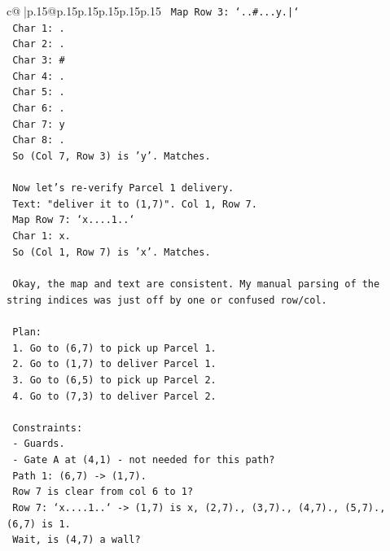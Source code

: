 \documentclass{article}
\begin{document}
{\begin{supertabular}{c@{$\;$}|p{.15\linewidth}@{}p{.15\linewidth}p{.15\linewidth}p{.15\linewidth}p{.15\linewidth}p{.15\linewidth}}
{{{\texttt{       Map Row 3: `..\#...y.|`} \\
\texttt{       Char 1: .} \\
\texttt{       Char 2: .} \\
\texttt{       Char 3: \#} \\
\texttt{       Char 4: .} \\
\texttt{       Char 5: .} \\
\texttt{       Char 6: .} \\
\texttt{       Char 7: y} \\
\texttt{       Char 8: .} \\
\texttt{       So (Col 7, Row 3) is 'y'. Matches.} \\
\\ 
\texttt{       Now let's re{-}verify Parcel 1 delivery.} \\
\texttt{       Text: "deliver it to (1,7)". Col 1, Row 7.} \\
\texttt{       Map Row 7: `x....1..`} \\
\texttt{       Char 1: x.} \\
\texttt{       So (Col 1, Row 7) is 'x'. Matches.} \\
\\ 
\texttt{       Okay, the map and text are consistent. My manual parsing of the string indices was just off by one or confused row/col.} \\
\\ 
\texttt{       Plan:} \\
\texttt{       1. Go to (6,7) to pick up Parcel 1.} \\
\texttt{       2. Go to (1,7) to deliver Parcel 1.} \\
\texttt{       3. Go to (6,5) to pick up Parcel 2.} \\
\texttt{       4. Go to (7,3) to deliver Parcel 2.} \\
\\ 
\texttt{       Constraints:} \\
\texttt{       {-} Guards.} \\
\texttt{       {-} Gate A at (4,1) {-} not needed for this path?} \\
\texttt{         Path 1: (6,7) {-}> (1,7).} \\
\texttt{         Row 7 is clear from col 6 to 1?} \\
\texttt{         Row 7: `x....1..` {-}> (1,7) is x, (2,7)., (3,7)., (4,7)., (5,7)., (6,7) is 1.} \\
\texttt{         Wait, is (4,7) a wall?} \\
}}}
\end{supertabular}}
\end{document}
